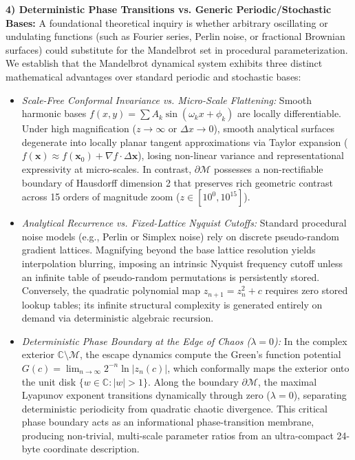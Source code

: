 \documentclass[10pt,journal,compsoc,twocolumn]{article}
\begin{document}
\textbf{4) Deterministic Phase Transitions vs. Generic Periodic/Stochastic Bases:} A foundational theoretical inquiry is whether arbitrary oscillating or undulating functions (such as Fourier series, Perlin noise, or fractional Brownian surfaces) could substitute for the Mandelbrot set in procedural parameterization. We establish that the Mandelbrot dynamical system exhibits three distinct mathematical advantages over standard periodic and stochastic bases:
\begin{itemize}
    \item \textit{Scale-Free Conformal Invariance vs. Micro-Scale Flattening:} Smooth harmonic bases $f(x, y) = \sum A_k \sin(\omega_k x + \phi_k)$ are locally differentiable. Under high magnification ($z \to \infty$ or $\Delta x \to 0$), smooth analytical surfaces degenerate into locally planar tangent approximations via Taylor expansion ($f(\mathbf{x}) \approx f(\mathbf{x}_0) + \nabla f \cdot \Delta \mathbf{x}$), losing non-linear variance and representational expressivity at micro-scales. In contrast, $\partial \mathcal{M}$ possesses a non-rectifiable boundary of Hausdorff dimension 2 that preserves rich geometric contrast across 15 orders of magnitude zoom ($z \in [10^0, 10^{15}]$).
    \item \textit{Analytical Recurrence vs. Fixed-Lattice Nyquist Cutoffs:} Standard procedural noise models (e.g., Perlin or Simplex noise) rely on discrete pseudo-random gradient lattices. Magnifying beyond the base lattice resolution yields interpolation blurring, imposing an intrinsic Nyquist frequency cutoff unless an infinite table of pseudo-random permutations is persistently stored. Conversely, the quadratic polynomial map $z_{n+1} = z_n^2 + c$ requires zero stored lookup tables; its infinite structural complexity is generated entirely on demand via deterministic algebraic recursion.
    \item \textit{Deterministic Phase Boundary at the Edge of Chaos ($\lambda = 0$):} In the complex exterior $\mathbb{C} \setminus \mathcal{M}$, the escape dynamics compute the Green's function potential $G(c) = \lim_{n \to \infty} 2^{-n} \ln |z_n(c)|$, which conformally maps the exterior onto the unit disk $\{w \in \mathbb{C} : |w| > 1\}$. Along the boundary $\partial \mathcal{M}$, the maximal Lyapunov exponent transitions dynamically through zero ($\lambda = 0$), separating deterministic periodicity from quadratic chaotic divergence. This critical phase boundary acts as an informational phase-transition membrane, producing non-trivial, multi-scale parameter ratios from an ultra-compact 24-byte coordinate description.
\end{itemize}
\end{document}
